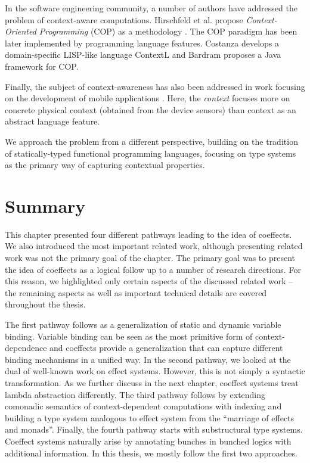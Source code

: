 In the software engineering community, a number of authors have addressed the
problem of context-aware computations. Hirschfeld et al. propose \emph{Context-Oriented Programming}
(COP) as a methodology \cite{app-cop-method}. The COP paradigm has been later implemented by
programming language features. Costanza \cite{app-cop-contextl} develops a domain-specific LISP-like
language ContextL and Bardram \cite{app-cop-javafwk} proposes a Java framework for COP.

Finally, the subject of context-awareness has also been addressed in work focusing on the development
of mobile applications \cite{app-cop-mobile,app-cop-mobile2}. Here, the \emph{context} focuses more
on concrete physical context (obtained from the device sensors) than context as an abstract
language feature.

We approach the problem from a different perspective, building on the tradition of
statically-typed functional programming languages, focusing on type systems as the primary way
of capturing contextual properties.


%
%

\section{Summary}

This chapter presented four different pathways leading to the idea of coeffects. We also
introduced the most important related work, although presenting related work was not the
primary goal of the chapter. The primary goal was to present the idea of coeffects as a logical
follow up to a number of research directions. For this reason, we highlighted only certain aspects
of the discussed related work -- the remaining aspects as well as important technical details are
covered throughout the thesis.

The first pathway follows as a generalization of static and dynamic variable binding. Variable
binding can be seen as the most primitive form of context-dependence and coeffects provide a
generalization that can capture different binding mechanisms in a unified way. In the second
pathway, we looked at the dual of well-known work on effect systems. However, this is not simply
a syntactic transformation. As we further discuss in the next chapter, coeffect systems treat lambda
abstraction differently. The third pathway follows by extending comonadic semantics of context-dependent
computations with indexing and building a type system analogous to effect system from the ``marriage of
effects and monads''. Finally, the fourth pathway starts with substructural type systems. Coeffect
systems naturally arise by annotating bunches in bunched logics with additional information. In this
thesis, we mostly follow the first two approaches.
